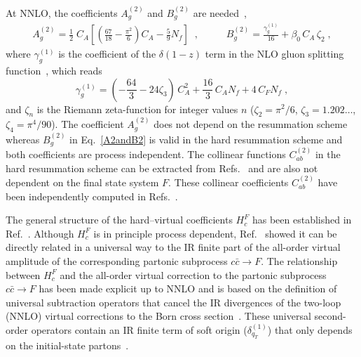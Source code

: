\documentclass[12pt]{article}
\def\beeq{\begin{eqnarray}}
\def\eeeq{\end{eqnarray}}
\newcommand\f[2]{\frac{#1}{#2}}
\def\to{\rightarrow}
\DeclareRobustCommand{\qt}{q_T}
\begin{document}
At NNLO, the coefficients $A^{(2)}_{g}$ and $B^{(2)}_{g}$ are needed~\cite{Bozzi:2005wk,Catani:2013tia},
\beeq
\label{A2andB2}
A^{(2)}_{g}= \frac{1}{2}\; C_A \left[ \left( \f{67}{18} - \f{\pi^2}{6}
\right) C_A - \f{5}{9} N_f \right] \;\;,\;\;\;\;\;\;\;\;\;\;B^{(2)}_{g}=\f{\gamma_{g}^{(1)}}{16}+\beta_0\, C_A\,\zeta_2\;,
\eeeq
where $\gamma_{g}^{(1)}$ is the coefficient of the $\delta(1-z)$ term in the NLO gluon splitting function~\cite{Curci:1980uw,Furmanski:1980cm}, which reads
\begin{equation}
\gamma_{g}^{(1)}= \left(-\frac{64}3-24\zeta_3\right)\,C_A^2
+\frac{16}3\,C_A N_f
+4\,C_F N_f\;,
\label{ga1g}
\end{equation}
and $\zeta_n$ is the Riemann zeta-function for integer values $n$ ($\zeta_2=\pi^2/6$, $\zeta_3=1.202\dots$, $\zeta_4=\pi^4/90$). The coefficient $A^{(2)}_{g}$ does not depend on the resummation scheme whereas $B^{(2)}_{g}$  in Eq.~\eqref{A2andB2} is valid in the hard resummation scheme and both coefficients are process independent. The collinear functions $C^{(2)}_{ab}$ in the hard resummation scheme can be extracted from Refs.~\cite{Catani:2013tia,Catani:2011kr,Catani:2012qa} and are also not dependent on the final state system $F$. These collinear coefficients $C^{(2)}_{ab}$ have been independently computed in Refs.~\cite{Gehrmann:2012ze,Echevarria:2016scs}.

The general structure of the hard--virtual coefficients $H^{F}_{c}$ has been established in Ref.~\cite{Catani:2013tia}. Although $H^{F}_{c}$ is in principle process dependent, Ref.~\cite{Catani:2013tia} showed it can be directly related in a universal way to the IR finite part of the all-order virtual amplitude of the corresponding partonic subprocess $c{\bar c}\to F$. The relationship between $H^{F}_{c}$ and the all-order virtual correction to the  partonic subprocess $c{\bar c}\to F$ has been made explicit up to NNLO and is based on the definition of universal subtraction operators that cancel the IR divergences of the two-loop (NNLO) virtual corrections to the Born cross section~\cite{Catani:1998bh}. These universal second-order operators contain an IR finite term of soft origin ($\delta^{(1)}_{\qt}$) that only depends on the initial-state partons~\cite{Catani:2013tia}.
\end{document}
